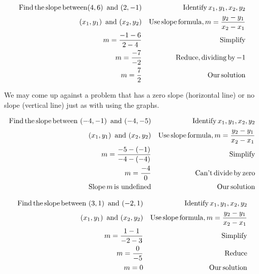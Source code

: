 \begin{example}\label{Lin50}
  \begin{eqnarray*}
    \operatorname{Find} \operatorname{the} \operatorname{slope} \operatorname{between} (4, 6) \operatorname{~and~} (2, -
    1) &  & \operatorname{Identify} x_1, y_1, x_2, y_2\\
    (x_1, y_1) \operatorname{~and~} (x_2, y_2) &  & \operatorname{Use} \operatorname{slope}
    \operatorname{formula}, m = \frac{y_2 - y_1}{x_2 - x_1}\\
    m = \frac{- 1 - 6}{2 - 4} &  & \operatorname{Simplify}\\
    m = \frac{- 7}{- 2} &  & \operatorname{Reduce}, \operatorname{dividing} \operatorname{by} - 1\\
    m = \frac{7}{2} &  & \operatorname{Our} \operatorname{solution}
  \end{eqnarray*}
\end{example}

 We may come up against a problem that has a zero slope (horizontal line) or no
slope (vertical line) just as with using the graphs.

\begin{example}\label{Lin51}
  
  \begin{eqnarray*}
    \operatorname{Find} \operatorname{the} \operatorname{slope} \operatorname{between~} (- 4, - 1) \operatorname{~and~}
    (- 4, - 5) &  & \operatorname{Identify} x_1, y_1, x_2, y_2\\
    (x_1, y_1) \operatorname{~and~} (x_2, y_2) &  & \operatorname{Use} \operatorname{slope}
    \operatorname{formula}, m = \frac{y_2 - y_1}{x_2 - x_1}\\
    m = \frac{- 5 - (- 1)}{- 4 - (- 4)} &  & \operatorname{Simplify}\\
    m = \frac{- 4}{0} &  & \operatorname{Can' t} \operatorname{divide} \operatorname{by} \operatorname{zero}\\
    \operatorname{Slope} m \operatorname{is~undefined} &  & \operatorname{Our} \operatorname{solution}
  \end{eqnarray*}
\end{example}

\begin{example}\label{Lin52}
  \begin{eqnarray*}
    \operatorname{Find} \operatorname{the} \operatorname{slope} \operatorname{between~} (3, 1) \operatorname{~and~} (- 2,
    1) &  & \operatorname{Identify} x_1, y_1, x_2, y_2\\
    (x_1, y_1) \operatorname{~and~} (x_2, y_2) &  & \operatorname{Use} \operatorname{slope}
    \operatorname{formula}, m = \frac{y_2 - y_1}{x_2 - x_1}\\
    m = \frac{1 - 1}{- 2 - 3} &  & \operatorname{Simplify}\\
    m = \frac{0}{- 5} &  & \operatorname{Reduce}\\
    m = 0 &  & \operatorname{Our} \operatorname{solution}
  \end{eqnarray*}
\end{example}


